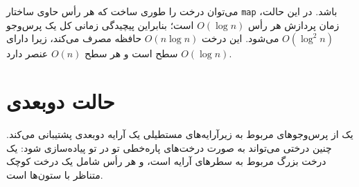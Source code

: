 می‌توان درخت را طوری ساخت که هر رأس حاوی ساختار \texttt{map} باشد. در این حالت، زمان پردازش هر رأس $O(\log n)$ است؛ بنابراین پیچیدگی زمانی کل یک پرس‌وجو $O(\log^2 n)$ می‌شود. این درخت $O(n \log n)$ حافظه مصرف می‌کند، زیرا دارای $O(\log n)$ سطح است و هر سطح $O(n)$ عنصر دارد.

\section{حالت دوبعدی}


یک  از پرس‌وجوهای مربوط به زیرآرایه‌های مستطیلی یک آرایه دوبعدی پشتیبانی می‌کند. چنین درختی می‌تواند به صورت درخت‌های پاره‌خطی تو در تو پیاده‌سازی شود: یک درخت بزرگ مربوط به سطرهای آرایه است، و هر رأس شامل یک درخت کوچک متناظر با ستون‌ها است.

